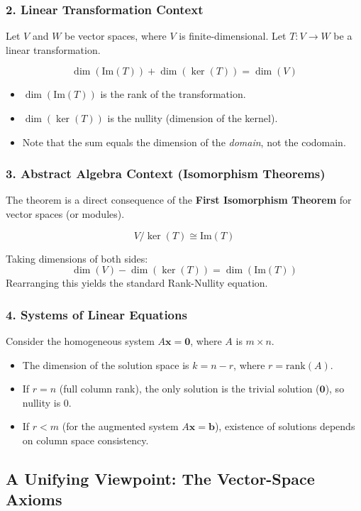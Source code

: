 \subsubsection{2. Linear Transformation Context}
Let $V$ and $W$ be vector spaces, where $V$ is finite-dimensional. Let $T: V \to W$ be a linear transformation.
\begin{theorem}
\[ \dim(\text{Im}(T)) + \dim(\ker(T)) = \dim(V) \]
\end{theorem}
\begin{itemize}
    \item $\dim(\text{Im}(T))$ is the rank of the transformation.
    \item $\dim(\ker(T))$ is the nullity (dimension of the kernel).
    \item Note that the sum equals the dimension of the \textit{domain}, not the codomain.
\end{itemize}

\subsubsection{3. Abstract Algebra Context (Isomorphism Theorems)}
The theorem is a direct consequence of the \textbf{First Isomorphism Theorem} for vector spaces (or modules).
\begin{theorem}
\[ V / \ker(T) \cong \text{Im}(T) \]
\end{theorem}
Taking dimensions of both sides:
\[ \dim(V) - \dim(\ker(T)) = \dim(\text{Im}(T)) \]
Rearranging this yields the standard Rank-Nullity equation.

\subsubsection{4. Systems of Linear Equations}
Consider the homogeneous system $A\mathbf{x} = \mathbf{0}$, where $A$ is $m \times n$.
\begin{itemize}
    \item The dimension of the solution space is $k = n - r$, where $r = \text{rank}(A)$.
    \item If $r = n$ (full column rank), the only solution is the trivial solution ($\mathbf{0}$), so nullity is 0.
    \item If $r < m$ (for the augmented system $A\mathbf{x}=\mathbf{b}$), existence of solutions depends on column space consistency.
\end{itemize}

\subsection{A Unifying Viewpoint: The Vector-Space Axioms}

